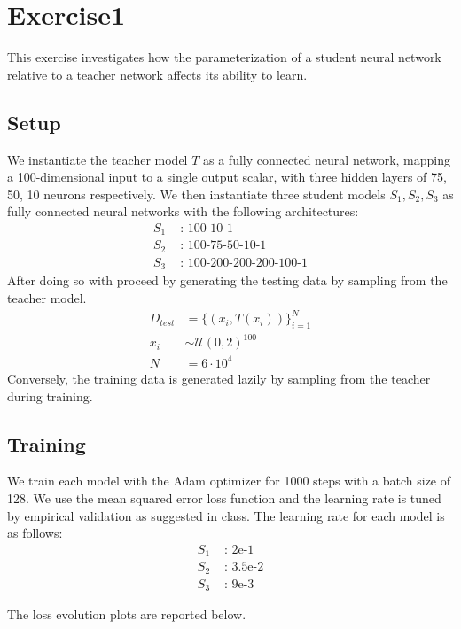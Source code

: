 \section{Exercise1}

This exercise investigates how the parameterization of a student neural
network relative to a teacher network affects its ability to learn.

\subsection{Setup}

We instantiate the teacher model $T$ as a fully connected neural network,
mapping a 100-dimensional input to a single output scalar, with three hidden
layers of 75, 50, 10 neurons respectively. 
We then instantiate three student models $S_1, S_2, S_3$ as fully connected neural
networks with the following architectures:
\begin{align*}
    S_1 &\text{ : 100-10-1}
    \\
    S_2 &\text{ : 100-75-50-10-1}
    \\
    S_3 &\text{ : 100-200-200-200-100-1}
\end{align*}
After doing so with proceed by generating
the testing data by sampling from the teacher model.
\begin{align*}
    D_{test} &= \{(x_i, T(x_i))\}_{i=1}^{N}
    \\
    x_i &\sim \mathcal{U}(0, 2)^{100}
    \\
    N &= 6 \cdot 10^4
\end{align*}
Conversely, the training data is generated lazily by sampling from the teacher
during training. 


\subsection{Training}
We train each model with the Adam optimizer for 1000 steps with a batch size of
128. We use the mean squared error loss function and the learning rate is tuned
by empirical validation as suggested in class. The learning rate for each model is as follows:
\begin{align*}
    S_1 &\text{ : 2e-1}
    \\
    S_2 &\text{ : 3.5e-2}
    \\
    S_3 &\text{ : 9e-3}
\end{align*}

The loss evolution plots are reported below.


 

